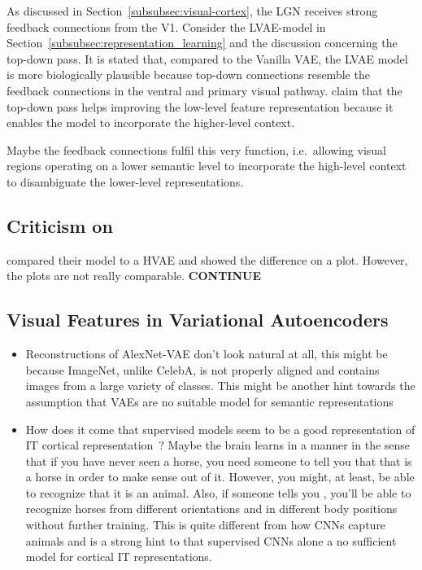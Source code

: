 \documentclass[11pt]{article}
\begin{document}
    As discussed in Section~\ref{subsubsec:visual-cortex}, the \ac{LGN} receives strong feedback connections from the \ac{V1}.
    Consider the \ac{LVAE}-model in Section~\ref{subsubsec:representation_learning} and the discussion concerning the top-down pass.
    It is stated that, compared to the Vanilla VAE, the \ac{LVAE} model is more biologically plausible because top-down connections resemble the feedback connections in the ventral and primary visual pathway.
    \citet{sonderby2016ladder} claim that the top-down pass helps improving the low-level feature representation because it enables the model to incorporate the higher-level context.

    Maybe the feedback connections fulfil this very function, i.e.\ allowing visual regions operating on a lower semantic level to incorporate the high-level context to disambiguate the lower-level representations.

    \subsection{Criticism on \citet{zhao2017learning}}
    \citet{zhao2017learning} compared their model to a HVAE and showed the difference on a plot.
    However, the plots are not really comparable.
    \textbf{CONTINUE}

    \subsection{Visual Features in Variational Autoencoders}\label{subsec:discussion_visual_features_in_variational_autoencoders}
    \begin{itemize}
        \item Reconstructions of AlexNet-VAE don't look natural at all, this might be because ImageNet, unlike CelebA, is not properly aligned and contains images from a large variety of classes.
        This might be another hint towards the assumption that \acp{VAE} are no suitable model for semantic representations
        \item How does it come that supervised models seem to be a good representation of \ac{IT} cortical representation~\citep{khaligh2014deep}? Maybe the brain learns in a  manner in the sense that if you have never seen a horse, you need someone to tell you that that is a horse in order to make sense out of it.
        However, you might, at least, be able to recognize that it is an animal.
        Also, if someone tells you , you'll be able to recognize horses from different orientations and in different body positions without further training.
        This is quite different from how \acp{CNN} capture animals and is a strong hint to that supervised \acp{CNN} alone a no sufficient model for cortical IT representations.
    \end{itemize}
\end{document}
